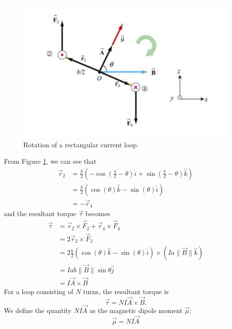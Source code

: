 \begin{figure}[h!]
    \centering
    \includegraphics{notes/images/Magnetic-Fields-Current-Loop-2.JPG}
    \caption{Rotation of a rectangular current loop.}
    \label{fig:magnetic-field-current-loop-2}
\end{figure}
\FloatBarrier

From Figure \ref{fig:magnetic-field-current-loop-2}, we can see that
\begin{align}
    \vec{r}_2 &= \frac{b}{2} \left(-\cos\left(\frac{\pi}{2} - \theta\right) \hat{i} + \sin\left(\frac{\pi}{2} - \theta\right)\hat{k}\right) \\
    &= \frac{b}{2}\left(\cos(\theta) \hat{k} - \sin (\theta) \hat{i}\right) \\
    &= - \vec{r}_4
\end{align}
and the resultant torque $\vec{\tau}$ becomes
\begin{align}
    \vec{\tau} &= \vec{r}_2 \times \vec{F}_2 + \vec{r}_4 \times \vec{F}_4 \\
    &= 2 \vec{r}_2 \times \vec{F}_2 \\
    &= 2 \frac{b}{2}\left(\cos(\theta) \hat{k} - \sin (\theta) \hat{i}\right) \times \left(Ia\| \vec{B} \| \hat{k}\right) \\
    &= Iab\| \vec{B} \| \sin \theta \hat{j} \\
    &= I \vec{A} \times \vec{B}
\end{align}
For a loop consisting of $N$ turns, the resultant torque is
\begin{equation}
    \vec{\tau} = NI \vec{A} \times \vec{B}.
\end{equation}
We define the quantity $NI\vec{A}$ as the magnetic dipole moment $\vec{\mu}$:
\begin{equation}
    \vec{\mu} = NI\vec{A}
\end{equation}

